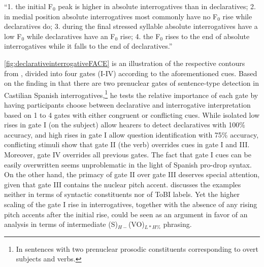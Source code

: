 \begin{displayquote}
``1. the initial F$_0$ peak is higher in absolute interrogatives than in declaratives; 2. in medial position absolute interrogatives most commonly have no F$_0$ rise while declaratives do; 3. during the final stressed syllable absolute interrogatives have a low F$_0$ while declaratives have an F$_0$ rise; 4. the F$_0$ rises to the end of absolute interrogatives while it falls to the end of declaratives.'' \citep[194]{Face2007} 
\end{displayquote}

\autoref{fig:declarativeinterrogativeFACE} is an illustration of the respective contours from \citet[199]{Face2007}, divided into four gates (I-IV) according to the aforementioned cues. Based on the finding in \citet{Face.2005} that there are two prenuclear gates of sentence-type detection in Castilian Spanish interrogatives,\footnote{In sentences with two prenuclear prosodic constituents corresponding to overt subjects and verbs.} he tests the relative importance of each gate by having participants choose between declarative and interrogative interpretation based on 1 to 4 gates with either congruent or conflicting cues. While isolated low rises in gate I (on the subject) allow hearers to detect declaratives with 100\% accuracy, and high rises in gate I allow question identification with 75\% accuracy, conflicting stimuli show that gate II (the verb) overrides cues in gate I and III. Moreover, gate IV overrides all previous gates. The fact that gate I cues can be easily overwritten seems unproblematic in the light of Spanish pro-drop syntax. On the other hand, the primacy of gate II over gate III deserves special attention, given that gate III contains the nuclear pitch accent. \citet{Face2007} discusses the examples neither in terms of syntactic constituents nor of ToBI labels. Yet the higher scaling of the gate I rise in interrogatives, together with the absence of any rising pitch accents after the initial rise, could be seen as an argument in favor of an analysis in terms of intermediate (S)$_{H-}$(VO)$_{L* H\%}$ phrasing.

